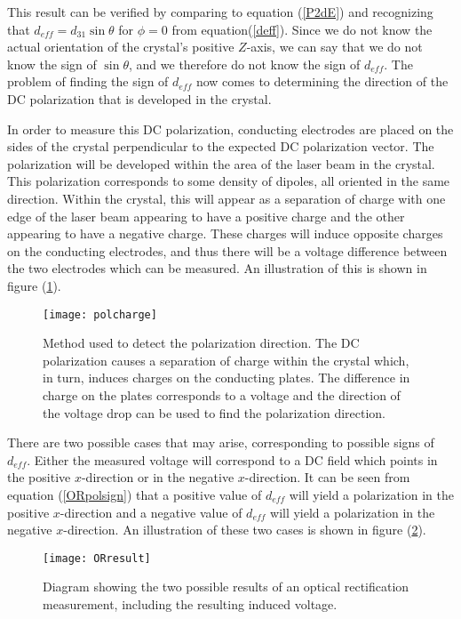This result can be verified by comparing to equation (\ref{P2dE})
and recognizing that $d_{eff}=d_{31} \sin{\theta}$ for $\phi=0$
from equation(\ref{deff}).  Since we do not know the actual
orientation of the crystal's positive $Z$-axis, we can say that we
do not know the sign of $\sin{\theta}$, and we therefore do not
know the sign of $d_{eff}$.  The problem of finding the sign of
$d_{eff}$ now comes to determining the direction of the DC
polarization that is developed in the crystal.

In order to measure this DC polarization, conducting electrodes
are placed on the sides of the crystal perpendicular to the
expected DC polarization vector.  The polarization will be
developed within the area of the laser beam in the crystal.  This
polarization corresponds to some density of dipoles, all oriented
in the same direction.  Within the crystal, this will appear as a
separation of charge with one edge of the laser beam appearing to
have a positive charge and the other appearing to have a negative
charge.  These charges will induce opposite charges on the
conducting electrodes, and thus there will be a voltage difference
between the two electrodes which can be measured.  An illustration
of this is shown in figure (\ref{polcharge}).

\begin{figure}
\texttt{[image: polcharge]}
\caption[Effect of DC polarization in BBO crystal]{Method used to
detect the polarization direction.  The DC polarization causes a
separation of charge within the crystal which, in turn, induces
charges on the conducting plates.  The difference in charge on the
plates corresponds to a voltage and the direction of the voltage
drop can be used to find the polarization direction.}
\label{polcharge}%
\end{figure}

There are two possible cases that may arise, corresponding to
possible signs of $d_{eff}$. Either the measured voltage will
correspond to a DC field which points in the positive
$x$-direction or in the negative $x$-direction. It can be seen
from equation (\ref{ORpolsign}) that a positive value of $d_{eff}$
will yield a polarization in the positive $x$-direction and a
negative value of $d_{eff}$ will yield a polarization in the
negative $x$-direction. An illustration of these two cases is
shown in figure (\ref{ORresult}).


\begin{figure}
\texttt{[image: ORresult]}
\caption[Possible results of optical rectification
measurement]{Diagram showing the two possible results of an
optical rectification measurement, including the resulting induced
voltage.}
\label{ORresult}%
\end{figure}
